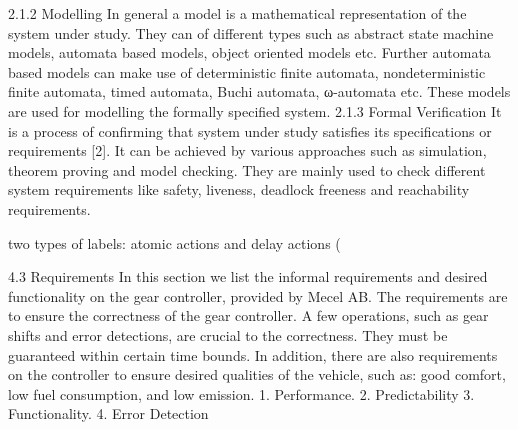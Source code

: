 \documentclass{article}
\begin{document}
	2.1.2 Modelling
	In general a model is a mathematical representation of the system under study. They can of different types such as abstract state machine models, automata based models, object oriented models etc. Further automata based models can make use of deterministic finite automata, nondeterministic finite automata, timed automata, Buchi automata, ω-automata etc. These models are used for modelling the formally specified system.
	2.1.3 Formal Verification
	It is a process of confirming that system under study satisfies its specifications or requirements [2]. It can be achieved by various approaches such as simulation, theorem proving and model checking. They are mainly used to check different system requirements like safety, liveness, deadlock freeness and reachability requirements.
	
	
	two types of labels: atomic actions and
	delay actions (
	
	
	
	4.3 Requirements
	In this section we list the informal requirements and desired functionality on the gear controller,
	provided by Mecel AB. The requirements are to ensure the correctness of the gear controller. A few
	operations, such as gear shifts and error detections, are crucial to the correctness. They must be
	guaranteed within certain time bounds. In addition, there are also requirements on the controller to
	ensure desired qualities of the vehicle, such as: good comfort, low fuel consumption, and low emission.
	1. Performance.
	2. Predictability
	3. Functionality.
	4. Error Detection
 
\end{document}
